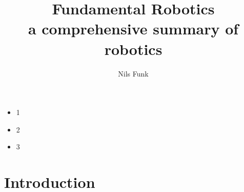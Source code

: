 \documentclass[11pt]{article}
\title{Fundamental Robotics \\ a comprehensive summary of robotics}
\author{Nils Funk}
\date{}
\begin{document}
\maketitle

\tableofcontents


\begin{itemize}
 \item 1
 \item 2
 \item 3
\end{itemize}

\section{Introduction}





















 
\end{document}
